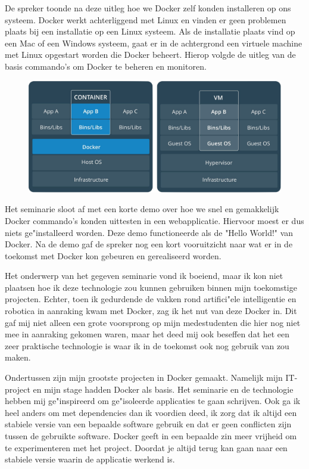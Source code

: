 De spreker toonde na deze uitleg hoe we Docker zelf konden installeren op ons systeem. Docker werkt achterliggend met Linux en vinden er geen problemen plaats bij een installatie op een Linux systeem. Als de installatie plaats vind op een Mac of een Windows systeem, gaat er in de achtergrond een virtuele machine met Linux opgestart worden die Docker beheert. Hierop volgde de uitleg van de basis commando's om Docker te beheren en monitoren.

\begin{figure}[!h]
  \centering
  \includegraphics[width=0.72\linewidth]{images/docker/docker_vs_vm.png}
\end{figure}

Het seminarie sloot af met een korte demo over hoe we snel en gemakkelijk Docker commando's konden uittesten in een webapplicatie. Hiervoor moest er dus niets ge"installeerd worden. Deze demo functioneerde als de "Hello World!" van Docker. Na de demo gaf de spreker nog een kort vooruitzicht naar wat er in de toekomst met Docker kon gebeuren en gerealiseerd worden.

Het onderwerp van het gegeven seminarie vond ik boeiend, maar ik kon niet plaatsen hoe ik deze technologie zou kunnen gebruiken binnen mijn toekomstige projecten. Echter, toen ik gedurdende de vakken rond artifici"ele intelligentie en robotica in aanraking kwam met Docker, zag ik het nut van deze Docker in. Dit gaf mij niet alleen een grote voorsprong op mijn medestudenten die hier nog niet mee in aanraking gekomen waren, maar het deed mij ook beseffen dat het een zeer praktische technologie is waar ik in de toekomst ook nog gebruik van zou maken.

Ondertussen zijn mijn grootste projecten in Docker gemaakt. Namelijk mijn IT\hyp{}project en mijn stage hadden Docker als basis. Het seminarie en de technologie hebben mij ge"inspireerd om ge"isoleerde applicaties te gaan schrijven. Ook ga ik heel anders om met dependencies dan ik voordien deed, ik zorg dat ik altijd een stabiele versie van een bepaalde software gebruik en dat er geen conflicten zijn tussen de gebruikte software. Docker geeft in een bepaalde zin meer vrijheid om te experimenteren met het project. Doordat je altijd terug kan gaan naar een stabiele versie waarin de applicatie werkend is.

